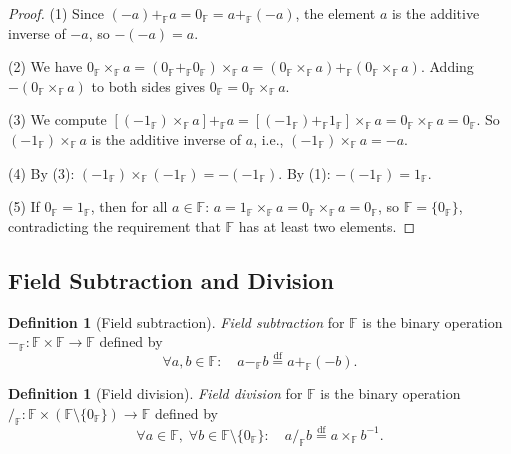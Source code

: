 \documentclass[11pt, a4paper, notitlepage]{report}
\theoremstyle{definition}
\newtheorem{definition}[theorem]{Definition}
\theoremstyle{remark}
\begin{document}
\begin{proof}
(1) Since $(-a) +_\mathbb{F} a = 0_\mathbb{F} = a +_\mathbb{F} (-a)$, the element $a$ is the additive inverse of $-a$, so $-(-a) = a$.

(2) We have $0_\mathbb{F} \times_\mathbb{F} a = (0_\mathbb{F} +_\mathbb{F} 0_\mathbb{F}) \times_\mathbb{F} a = (0_\mathbb{F} \times_\mathbb{F} a) +_\mathbb{F} (0_\mathbb{F} \times_\mathbb{F} a)$. Adding $-(0_\mathbb{F} \times_\mathbb{F} a)$ to both sides gives $0_\mathbb{F} = 0_\mathbb{F} \times_\mathbb{F} a$.

(3) We compute $[(-1_\mathbb{F}) \times_\mathbb{F} a] +_\mathbb{F} a = [(-1_\mathbb{F}) +_\mathbb{F} 1_\mathbb{F}] \times_\mathbb{F} a = 0_\mathbb{F} \times_\mathbb{F} a = 0_\mathbb{F}$. So $(-1_\mathbb{F}) \times_\mathbb{F} a$ is the additive inverse of $a$, i.e., $(-1_\mathbb{F}) \times_\mathbb{F} a = -a$.

(4) By (3): $(-1_\mathbb{F}) \times_\mathbb{F} (-1_\mathbb{F}) = -(-1_\mathbb{F})$. By (1): $-(-1_\mathbb{F}) = 1_\mathbb{F}$.

(5) If $0_\mathbb{F} = 1_\mathbb{F}$, then for all $a \in \mathbb{F}$: $a = 1_\mathbb{F} \times_\mathbb{F} a = 0_\mathbb{F} \times_\mathbb{F} a = 0_\mathbb{F}$, so $\mathbb{F} = \{0_\mathbb{F}\}$, contradicting the requirement that $\mathbb{F}$ has at least two elements.
\end{proof}

\subsection{Field Subtraction and Division}

\begin{definition}[Field subtraction]\label{def:field-subtraction}
\emph{Field subtraction} for $\mathbb{F}$ is the binary operation $-_\mathbb{F} : \mathbb{F} \times \mathbb{F} \to \mathbb{F}$ defined by
\[ \forall a, b \in \mathbb{F}: \quad a -_\mathbb{F} b \stackrel{\mathrm{df}}{=} a +_\mathbb{F} (-b). \]
\end{definition}

\begin{definition}[Field division]\label{def:field-division}
\emph{Field division} for $\mathbb{F}$ is the binary operation $/_\mathbb{F} : \mathbb{F} \times (\mathbb{F} \setminus \{0_\mathbb{F}\}) \to \mathbb{F}$ defined by
\[ \forall a \in \mathbb{F},\; \forall b \in \mathbb{F} \setminus \{0_\mathbb{F}\}: \quad a/_\mathbb{F} b \stackrel{\mathrm{df}}{=} a \times_\mathbb{F} b^{-1}. \]
\end{definition}
\end{document}
